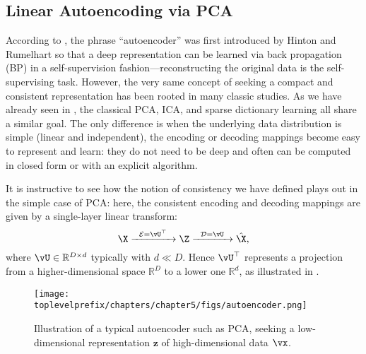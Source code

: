 \documentclass[../../book-main.tex]{subfiles}
\begin{document}
\subsection{Linear Autoencoding via PCA}
According to \cite{Baldi2011}, the phrase ``autoencoder'' was first
introduced by Hinton and Rumelhart \cite{Rumelhart1986} so that a
deep representation can be learned via back propagation (BP) in a self-supervision fashion---reconstructing the original data is the self-supervising task. However, the very same concept of seeking a compact and consistent representation has been rooted in many classic studies. As we have already seen in , the classical PCA, ICA, and sparse dictionary learning all share a similar goal. The only difference is when the underlying data distribution is simple (linear and
independent), the encoding or decoding mappings become easy to represent and
learn: they do not need to be deep and often can be computed in closed form or
with an explicit algorithm.

It is instructive to see how the notion of consistency we have
defined plays out in the simple case of PCA:
here, the consistent encoding and decoding mappings are given by a single-layer
linear transform:
\begin{equation}
  \X \xrightarrow{\hspace{2mm} \mathcal{E} = \vU^\top \hspace{2mm}}
  \Z \xrightarrow{\hspace{2mm} \mathcal{D} = \vU \hspace{2mm}}   \hat{\X},
  \label{eqn:autoencoding-PCA-2}
\end{equation}
where $\vU \in \mathbb{R}^{D\times d}$ typically with $d\ll D$. Hence
$\vU^\top $ represents a projection from a higher-dimensional space
$\mathbb{R}^{D}$  to a lower one $\mathbb{R}^{d}$, as illustrated in
.
\begin{figure}
  \centering \texttt{[image: \\toplevelprefix/chapters/chapter5/figs/autoencoder.png]}
  \caption{Illustration of a typical autoencoder such as PCA, seeking
  a low-dimensional representation $\bm{z}$ of high-dimensional data $\vx$.}
  \label{fig:AE}
\end{figure}
\end{document}
